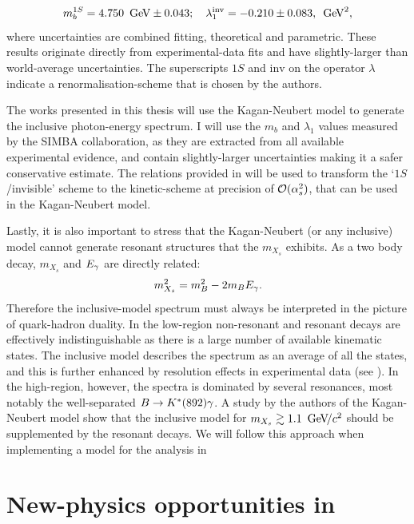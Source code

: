 \begin{equation}\label{eq:simba_result}
    m_b^{1S} =4.750~\mathrm{\,Ge\kern -0.1em V} \pm 0.043;  \quad \lambda^{\mathrm{inv}}_1 = -0.210\pm0.083,~\mathrm{\,Ge\kern -0.1em V}^2, 
\end{equation}
where uncertainties are combined fitting, theoretical and parametric.
These results originate directly from experimental-data fits and have slightly-larger than world-average uncertainties.
The superscripts $1S$ and $\mathrm{inv}$ on the operator $\lambda$ indicate a renormalisation-scheme that is chosen by the authors.

The works presented in this thesis will use the Kagan-Neubert model to generate the inclusive photon-energy spectrum.
I will use the $m_b$ and $\lambda_1$ values measured by the SIMBA collaboration, as they are extracted from all available experimental evidence, and contain slightly-larger uncertainties making it a safer conservative estimate.
The relations provided in \cite{Ligeti:2008ac} will be used to transform the `$1S$/invisible' scheme to the kinetic-scheme at precision of ${\cal O}(\alpha_s^2)$, that can be used in the Kagan-Neubert model.

Lastly, it is also important to stress that the Kagan-Neubert (or any inclusive) model cannot generate resonant structures that the $m_{X_s}$ exhibits.
As a two body decay, $m_{X_s}$ and ${E_{\gamma}}$ are directly related:
\begin{equation}
    m_{X_s}^2 = m_B^2 - 2m_B{E_{\gamma}}.
\end{equation}
Therefore the inclusive-model spectrum must always be interpreted in the picture of quark-hadron duality.
In the low-\Egamma region non-resonant and resonant decays are effectively indistinguishable as there is a large number of available kinematic states.
The inclusive model describes the spectrum as an average of all the states, and this is further enhanced by resolution effects in experimental data (see ).
In the high-\Egamma region, however, the spectra is dominated by several resonances, most notably the well-separated $B\rightarrow K^*(892)\gamma$.
A study by the authors of the Kagan-Neubert model \cite{Kagan:1998ym} show that the inclusive model for $m_{X_s}\gtrsim 1.1~{\mathrm{\,Ge\kern -0.1em V\!/}c^2}$ should be supplemented by the resonant decays.
We will follow this approach when implementing a model for the analysis in 

\section{New-physics opportunities in \texorpdfstring{\BtoXsdgamma}{B->Xsg}}\label{sec:btosgamma_bsm}

